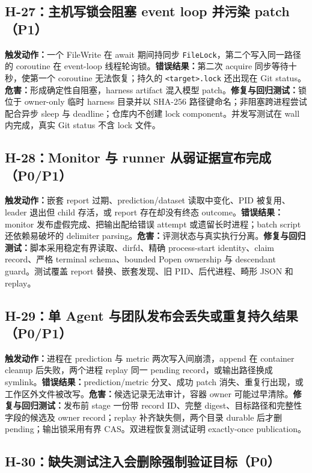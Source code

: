 \documentclass[11pt,a4paper,fontset=fandol]{ctexart}
\newcommand{\code}[1]{\texttt{#1}}
\begin{document}
\subsection{H-27：主机写锁会阻塞 event loop 并污染 patch（P1）}

\textbf{触发动作：}一个 FileWrite 在 await 期间持同步 \code{FileLock}，第二个写入同一路径的 coroutine 在 event-loop 线程轮询锁。\textbf{错误结果：}第二次 acquire 同步等待十秒，使第一个 coroutine 无法恢复；持久的 \code{<target>.lock} 还出现在 Git status。\textbf{危害：}形成确定性自阻塞，harness artifact 混入模型 patch。\textbf{修复与回归测试：}锁位于 owner-only 临时 harness 目录并以 SHA-256 路径键命名；非阻塞跨进程尝试配合异步 sleep 与 deadline；仓库内不创建 lock component。并发写测试在 wall 内完成，真实 Git status 不含 lock 文件。

\subsection{H-28：Monitor 与 runner 从弱证据宣布完成（P0/P1）}

\textbf{触发动作：}嵌套 report 过期、prediction/dataset 读取中变化、PID 被复用、leader 退出但 child 存活，或 report 存在却没有终态 outcome。\textbf{错误结果：}monitor 发布虚假完成、把输出配给错误 attempt 或遗留长时进程；batch script 还依赖易破坏的 delimiter parsing。\textbf{危害：}评测状态与真实执行分离。\textbf{修复与回归测试：}脚本采用稳定有界读取、dirfd、精确 process-start identity、claim record、严格 terminal schema、bounded Popen ownership 与 descendant guard。测试覆盖 report 替换、嵌套发现、旧 PID、后代进程、畸形 JSON 和 replay。

\subsection{H-29：单 Agent 与团队发布会丢失或重复持久结果（P0/P1）}

\textbf{触发动作：}进程在 prediction 与 metric 两次写入间崩溃，append 在 container cleanup 后失败，两个进程 replay 同一 pending record，或输出路径换成 symlink。\textbf{错误结果：}prediction/metric 分叉、成功 patch 消失、重复行出现，或工作区外文件被改写。\textbf{危害：}候选记录无法审计，容器 owner 可能过早清除。\textbf{修复与回归测试：}发布前 stage 一份带 record ID、完整 digest、目标路径和完整性字段的候选及 owner record；replay 补齐缺失侧，两个目录 durable 后才删 pending；输出锁采用有界 CAS。双进程恢复测试证明 exactly-once publication。

\subsection{H-30：缺失测试注入会删除强制验证目标（P0）}
\end{document}
